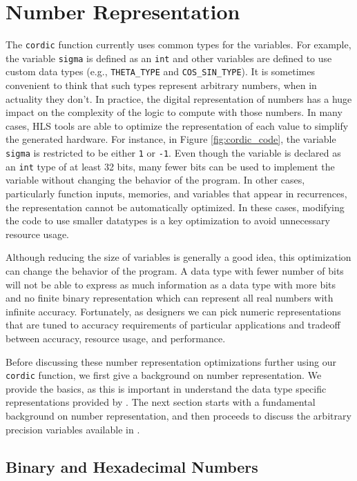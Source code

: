 \section{Number Representation}
\label{sec:number_representation}

The \lstinline{cordic} function currently uses common types for the variables. For example, the variable \lstinline{sigma} is defined as an \lstinline{int} and other variables are defined to use custom data types (e.g., \lstinline{THETA_TYPE} and \lstinline{COS_SIN_TYPE}).  It is sometimes convenient to think that such types represent arbitrary numbers, when in actuality they don't.  In practice, the digital representation of numbers has a huge impact on the complexity of the logic to compute with those numbers.   In many cases, HLS tools are able to optimize the representation of each value to simplify the generated hardware.  For instance, in Figure \ref{fig:cordic_code}, the variable \lstinline{sigma} is restricted to be either \lstinline{1} or \lstinline{-1}.  Even though the variable is declared as an \lstinline{int} type of at least 32 bits, many fewer bits can be used to implement the variable without changing the behavior of the program. In other cases, particularly function inputs, memories, and variables that appear in recurrences, the representation cannot be automatically optimized.  In these cases, modifying the code to use smaller datatypes is a key optimization to avoid unnecessary resource usage.

Although reducing the size of variables is generally a good idea, this optimization can change the behavior of the program. A data type with fewer number of bits will not be able to express as much information as a data type with more bits and no finite binary representation which can represent all real numbers with infinite accuracy. Fortunately, as designers we can pick numeric representations that are tuned to accuracy requirements of particular applications and tradeoff between accuracy, resource usage, and performance.

Before discussing these number representation optimizations further using our \lstinline{cordic} function, we first give a background on number representation. We provide the basics, as this is important in understand the data type specific representations provided by \VHLS. The next section starts with a fundamental background on number representation, and then proceeds to discuss the arbitrary precision variables available in \VHLS.

\subsection{Binary and Hexadecimal Numbers}

